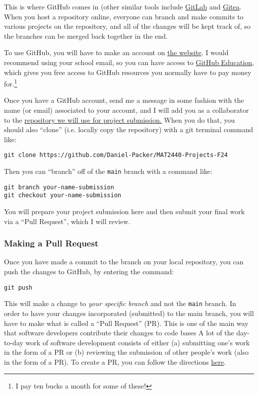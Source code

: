 \documentclass{article}
\begin{document}
This is where GitHub comes in (other similar tools include \href{https://gitlab.com}{GitLab} and \href{https://about.gitea.com/}{Gitea}.
When you host a repository online, everyone can branch and make commits to various projects on the repository, and all of the changes will be kept track of, so the branches can be merged back together in the end.

To use GitHub, you will have to make an account on \href{https://github.com}{the website}.
I would recommend using your school email, so you can have access to \href{https://github.com/education}{GitHub Education}, which gives you free access to GitHub resources you normally have to pay money for.\footnote{I pay ten bucks a month for some of these!}

Once you have a GitHub account, send me a message in some fashion with the name (or email) associated to your account, and I will add you as a collaborator to the \href{https://github.com/Daniel-Packer/MAT2440-Projects-F24}{repository we will use for project submission.}
When you do that, you should also ``clone'' (i.e. locally copy the repository) with a git terminal command like:
\begin{verbatim}
git clone https://github.com/Daniel-Packer/MAT2440-Projects-F24
\end{verbatim}

Then you can ``branch'' off of the \texttt{main} branch with a command like:
\begin{verbatim}
git branch your-name-submission
git checkout your-name-submission
\end{verbatim}
 
You will prepare your project submission here and then submit your final work via a ``Pull Request'', which I will review.

\subsubsection{Making a Pull Request}
Once you have made a commit to the branch on your local repository, you can push the changes to GitHub, by entering the command:
\begin{verbatim}
git push
\end{verbatim}
This will make a change to \textit{your specific branch} and not the \texttt{main} branch.
In order to have your changes incorporated (submitted) to the main branch, you will have to make what is called a ``Pull Request'' (PR).
This is one of the main way that software developers contribute their changes to code bases
A lot of the day-to-day work of software development consists of either (a) submitting one's work in the form of a PR or (b) reviewing the submission of other people's work (also in the form of a PR).
To create a PR, you can follow the directions \href{https://docs.github.com/en/pull-requests/collaborating-with-pull-requests/proposing-changes-to-your-work-with-pull-requests/creating-a-pull-request}{here}.
\end{document}
